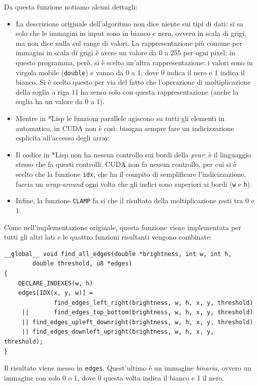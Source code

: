 \documentclass[12pt,a4paper,openright,twoside]{report}
\begin{document}
Da questa funzione notiamo alcuni dettagli:

\begin{itemize}
    \item La descrizione originale dell'algoritmo non dice niente sui tipi di dati: si sa solo che le immagini in input sono in bianco e nero, ovvero in scala di grigi, ma non dice nulla sul range di valori. La rappresentazione più comune per immagini in scala di grigi è avere un valore da 0 a 255 per ogni pixel; in questo programma, però, si è scelto un'altra rappresentazione: i valori sono in virgola mobile (\verb|double|) e vanno da 0 a 1, dove 0 indica il nero e 1 indica il bianco. Si è scelto questo per via del fatto che l'operazione di moltiplicazione della soglia a riga 11 ha senso solo con questa rappresentazione (anche la soglia ha un valore da 0 a 1).
    \item Mentre in *Lisp le funzioni parallele agiscono su tutti gli elementi in automatico, in CUDA non è così: bisogna sempre fare un indicizzazione esplicita all'accesso degli array.
    \item Il codice in *Lisp non ha nessun controllo sui bordi della \textit{pvar}: è il linguaggio stesso che fa questi controlli. CUDA non fa nessun controllo, per cui si è scelto che la funzione \verb|idx|, che ha il compito di semplificare l'indicizzazione, faccia un \textit{wrap-around} ogni volta che gli indici sono superiori ai bordi (\verb|w| e \verb|h|).
    \item Infine, la funzione \verb|CLAMP| fa si che il risultato della moltiplicazione resti tra 0 e 1.
\end{itemize}

Come nell'implementazione originale, questa funzione viene implementata per tutti gli altri lati e le quattro funzioni risultanti vengono combinate:

\newpage

\begin{lstlisting}[style=mystyle]
__global__ void find_all_edges(double *brightness, int w, int h,
        double threshold, u8 *edges)
{
    DECLARE_INDEXES(w, h)
    edges[IDX(x, y, w)] =
              find_edges_left_right(brightness, w, h, x, y, threshold)
     ||       find_edges_top_bottom(brightness, w, h, x, y, threshold)
     || find_edges_upleft_downright(brightness, w, h, x, y, threshold)
     || find_edges_downleft_upright(brightness, w, h, x, y, threshold);
}
\end{lstlisting}

Il risultato viene messo in \verb|edges|. Quest'ultimo è un immagine \textit{binaria}, ovvero un immagine con solo 0 o 1, dove 0 questa volta indica il bianco e 1 il nero.
\end{document}
